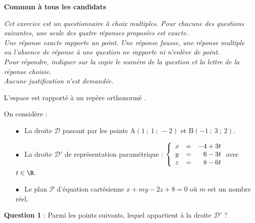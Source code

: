 
\textbf{Commun à tous les candidats}

\medskip

\emph{Cet exercice est un questionnaire à choix multiples. Pour chacune des questions suivantes, une seule des quatre réponses proposées est exacte. \\
Une réponse exacte rapporte un point. Une réponse fausse, une réponse multiple ou l'absence de réponse à une question ne rapporte ni n'enlève de point.\\
Pour répondre, indiquer sur la copie le numéro de la question et la lettre de la réponse choisie.\\
Aucune justification n'est demandée.}

\medskip

L'espace  est rapporté à un repère orthonormé \Oijk. 

On considère :

\setlength\parindent{9mm}
\begin{itemize}
\item[$\bullet~~$]La droite $\mathcal{D}$ passant par les points A$(1~;~1~;~ -2)$ et B$(-1~;~3~;~2)$. 
\item[$\bullet~~$]La droite $\mathcal{D}'$ de représentation paramétrique :
$\left\{\begin{array}{l c l}
x &=& -4 +3t\\
y&=&\phantom{-}6 - 3t\\
z&=&\phantom{-}8 - 6t
\end{array}\right.$\quad avec $t \in \R$.
\item[$\bullet~~$]Le plan $\mathcal{P}$ d'équation cartésienne $x + my- 2z + 8 = 0$ où $m$ est un nombre réel.
\end{itemize}
\setlength\parindent{0mm}

\medskip

\textbf{Question 1} : Parmi les points suivants, lequel appartient à la droite $\mathcal{D}'$ ?

